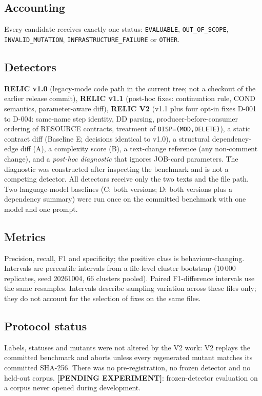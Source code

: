 \subsection{Accounting}
Every candidate receives exactly one status: \texttt{EVALUABLE},
\texttt{OUT\_OF\_SCOPE}, \texttt{INVALID\_MUTATION},
\texttt{INFRASTRUCTURE\_FAILURE} or \texttt{OTHER}.

\subsection{Detectors}
\textbf{RELIC v1.0} (legacy-mode code path in the current tree; not a checkout of
the earlier release commit), \textbf{RELIC v1.1} (post-hoc fixes: continuation
rule, COND semantics, parameter-aware diff), \textbf{RELIC V2} (v1.1 plus four
opt-in fixes D-001 to D-004: same-name step identity, DD parsing, producer-before-consumer
ordering of RESOURCE contracts, treatment of \texttt{DISP=(MOD,DELETE)}),
a static contract diff (Baseline E; decisions identical to v1.0), a structural
dependency-edge diff (A), a complexity score (B), a text-change reference (any
non-comment change), and a \emph{post-hoc diagnostic} that ignores JOB-card
parameters. The diagnostic was constructed after inspecting the benchmark and is
not a competing detector. All detectors receive only the two texts and the file path.
Two language-model baselines (C: both versions; D: both versions plus a dependency
summary) were run once on the committed benchmark with one model and one prompt.

\subsection{Metrics}
Precision, recall, F1 and specificity; the positive class is behaviour-changing.
Intervals are percentile intervals from a file-level cluster bootstrap
(10\,000 replicates, seed 20261004, 66 clusters pooled). Paired F1-difference
intervals use the same resamples. Intervals describe sampling variation across
these files only; they do not account for the selection of fixes on the same
files.

\subsection{Protocol status}
Labels, statuses and mutants were not altered by the V2 work: V2 replays the
committed benchmark and aborts unless every regenerated mutant matches its
committed SHA-256. There was no pre-registration, no frozen detector and no
held-out corpus. \textbf{[PENDING EXPERIMENT]}: frozen-detector evaluation on a
corpus never opened during development.
